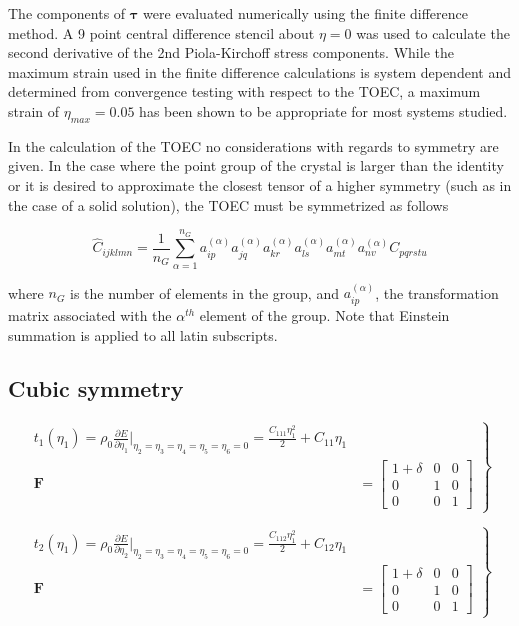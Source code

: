 \documentclass[showpacs,aps,floatfix,prb,reprint,superscriptaddress,onecolumn]{revtex4-1}
\begin{document}
\begin{enumerate}
The components of $\mathbf{\tau}$ were evaluated numerically using the finite difference method.  A 9 point central difference stencil about $\eta=0$ was used to calculate the second derivative of the 2nd Piola-Kirchoff stress components.    While the maximum strain used in the finite difference calculations is system dependent and determined from convergence testing with respect to the TOEC, a maximum strain of $\eta_{max} = 0.05$ has been shown to be appropriate for most systems studied.

In the calculation of the TOEC no considerations with regards to symmetry are given.  In the case where the point group of the crystal is larger than the identity or it is desired to approximate the closest tensor of a higher symmetry (such as in the case of a solid solution), the TOEC must be symmetrized as follows

\begin{equation}
\hat{C}_{ijklmn} = \frac{1}{n_G} \sum\limits_{\alpha=1}^{n_G}  a^{(\alpha)}_{ip}  a^{(\alpha)}_{jq}  a^{(\alpha)}_{kr}  a^{(\alpha)}_{ls}  a^{(\alpha)}_{mt}  a^{(\alpha)}_{nv} C_{pqrstu}
\end{equation}

where $n_G$ is the number of elements in the group, and $a_{ip}^{(\alpha)}$, the transformation matrix associated with the $\alpha^{th}$ element of the group.  Note that Einstein summation is applied to all latin subscripts.



\subsection{Cubic symmetry}


\begin{equation}
\label{eqn:SM-hexs1}
  \left.\begin{aligned}
        t_{1} \left(\eta_{1}\right) = \rho_{0} \frac{\partial E}{\partial \eta_{1}}\Bigr|_{\eta_2=\eta_3=\eta_4=\eta_5=\eta_6=0} = \frac{C_{111}\eta_{1}^2}{2} + C_{11}\eta_{1}\\
        \bm{F}&=\begin{bmatrix} 1+\delta & 0 & 0 \\ 0 & 1 & 0 \\ 0 & 0 & 1 \end{bmatrix}
       \end{aligned}
			\right\}
\end{equation}


\begin{equation}
\label{eqn:SM-hexs2}
  \left.\begin{aligned}
        t_{2} \left(\eta_{1}\right) = \rho_{0} \frac{\partial E}{\partial \eta_{2}}\Bigr|_{\eta_2=\eta_3=\eta_4=\eta_5=\eta_6=0} = \frac{C_{112}\eta_{1}^2}{2} + C_{12}\eta_{1}\\
        \bm{F}&=\begin{bmatrix} 1+\delta & 0 & 0 \\ 0 & 1 & 0 \\ 0 & 0 & 1 \end{bmatrix}
       \end{aligned}
			\right\}
\end{equation}


\end{enumerate}
\end{document}
